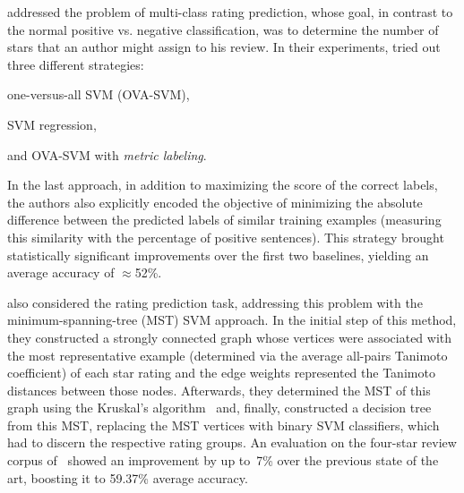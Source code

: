 
\citet{Pang:05} addressed the problem of multi-class rating
prediction, whose goal, in contrast to the normal positive
vs. negative classification, was to determine the number of stars that
an author might assign to his review.  In their experiments,
\citeauthor{Pang:05} tried out three different strategies:
\begin{inparaenum}[(i)]
  \item one-versus-all SVM (OVA-SVM),
  \item SVM regression,
  \item and OVA-SVM with \emph{metric labeling}.
\end{inparaenum}
In the last approach, in addition to maximizing the score of the
correct labels, the authors also explicitly encoded the objective of
minimizing the absolute difference between the predicted labels of
similar training examples (measuring this similarity with the
percentage of positive sentences).  This strategy brought
statistically significant improvements over the first two baselines,
yielding an average accuracy of $\approx$52\%.


\citet{Bickerstaffe:10} also considered the rating prediction task,
addressing this problem with the minimum-spanning-tree (MST) SVM
approach.  In the initial step of this method, they constructed a
strongly connected graph whose vertices were associated with the most
representative example (determined via the average all-pairs Tanimoto
coefficient) of each star rating and the edge weights represented the
Tanimoto distances between those nodes.  Afterwards, they determined
the MST of this graph using the Kruskal's
algorithm~\cite[see][pp.~567--574]{Cormen:09} and, finally,
constructed a decision tree from this MST, replacing the MST vertices
with binary SVM classifiers, which had to discern the respective
rating groups. An evaluation on the four-star review corpus
of~\citet{Pang:05} showed an improvement by up to~7\% over the
previous state of the art, boosting it to 59.37\% average accuracy.


